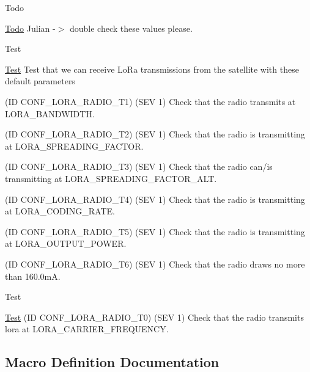 \begin{DoxyRefDesc}{Todo}
\item[\hyperlink{todo__todo000004}{Todo}]Julian -\/$>$ double check these values please. \end{DoxyRefDesc}
\begin{DoxyRefDesc}{Test}
\item[\hyperlink{test__test000026}{Test}]Test that we can receive Lo\+Ra transmissions from the satellite with these default parameters 

(ID C\+O\+N\+F\+\_\+\+L\+O\+R\+A\+\_\+\+R\+A\+D\+I\+O\+\_\+\+T1) (S\+EV 1) Check that the radio transmits at L\+O\+R\+A\+\_\+\+B\+A\+N\+D\+W\+I\+D\+TH. 

(ID C\+O\+N\+F\+\_\+\+L\+O\+R\+A\+\_\+\+R\+A\+D\+I\+O\+\_\+\+T2) (S\+EV 1) Check that the radio is transmitting at L\+O\+R\+A\+\_\+\+S\+P\+R\+E\+A\+D\+I\+N\+G\+\_\+\+F\+A\+C\+T\+OR. 

(ID C\+O\+N\+F\+\_\+\+L\+O\+R\+A\+\_\+\+R\+A\+D\+I\+O\+\_\+\+T3) (S\+EV 1) Check that the radio can/is transmitting at L\+O\+R\+A\+\_\+\+S\+P\+R\+E\+A\+D\+I\+N\+G\+\_\+\+F\+A\+C\+T\+O\+R\+\_\+\+A\+LT. 

(ID C\+O\+N\+F\+\_\+\+L\+O\+R\+A\+\_\+\+R\+A\+D\+I\+O\+\_\+\+T4) (S\+EV 1) Check that the radio is transmitting at L\+O\+R\+A\+\_\+\+C\+O\+D\+I\+N\+G\+\_\+\+R\+A\+TE. 

(ID C\+O\+N\+F\+\_\+\+L\+O\+R\+A\+\_\+\+R\+A\+D\+I\+O\+\_\+\+T5) (S\+EV 1) Check that the radio is transmitting at L\+O\+R\+A\+\_\+\+O\+U\+T\+P\+U\+T\+\_\+\+P\+O\+W\+ER. 

(ID C\+O\+N\+F\+\_\+\+L\+O\+R\+A\+\_\+\+R\+A\+D\+I\+O\+\_\+\+T6) (S\+EV 1) Check that the radio draws no more than 160.\+0mA.\end{DoxyRefDesc}


\begin{DoxyRefDesc}{Test}
\item[\hyperlink{test__test000027}{Test}](ID C\+O\+N\+F\+\_\+\+L\+O\+R\+A\+\_\+\+R\+A\+D\+I\+O\+\_\+\+T0) (S\+EV 1) Check that the radio transmits lora at L\+O\+R\+A\+\_\+\+C\+A\+R\+R\+I\+E\+R\+\_\+\+F\+R\+E\+Q\+U\+E\+N\+CY. \end{DoxyRefDesc}


\subsection{Macro Definition Documentation}
\mbox{\label{group__defines__radio__lora__configuration_ga33702007527b9cea6e029b919322a7a5}} 
